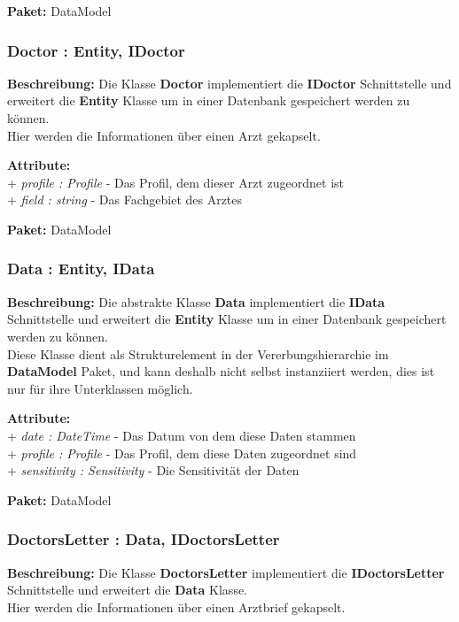 \documentclass[a4paper]{scrreprt}
\begin{document}
\textbf{Paket:} DataModel

\subsubsection{Doctor : Entity, IDoctor}
\textbf{Beschreibung:} Die Klasse \textbf{Doctor} implementiert die \textbf{IDoctor} Schnittstelle und erweitert die \textbf{Entity} Klasse um in einer Datenbank gespeichert werden zu können.\\
Hier werden die Informationen über einen Arzt gekapselt.

\textbf{Attribute:}\\ 
+ \textit{profile : Profile} - Das Profil, dem dieser Arzt zugeordnet ist\\
+ \textit{field : string} - Das Fachgebiet des Arztes

\textbf{Paket:} DataModel

\subsubsection{Data : Entity, IData}
\textbf{Beschreibung:} Die abstrakte Klasse \textbf{Data} implementiert die \textbf{IData} Schnittstelle und erweitert die \textbf{Entity} Klasse um in einer Datenbank gespeichert werden zu können.\\
Diese Klasse dient als Strukturelement in der Vererbungshierarchie im \textbf{DataModel} Paket, und kann deshalb nicht selbst instanziiert werden, dies ist nur für ihre Unterklassen möglich.

\textbf{Attribute:}\\
+ \textit{date : DateTime} - Das Datum von dem diese Daten stammen\\
+ \textit{profile : Profile} - Das Profil, dem diese Daten zugeordnet sind\\
+ \textit{sensitivity : Sensitivity} - Die Sensitivität der Daten

\textbf{Paket:} DataModel

\subsubsection{DoctorsLetter : Data, IDoctorsLetter}
\textbf{Beschreibung:} Die Klasse \textbf{DoctorsLetter} implementiert die \textbf{IDoctorsLetter} Schnittstelle und erweitert die \textbf{Data} Klasse.\\
Hier werden die Informationen über einen  Arztbrief gekapselt.
\end{document}
